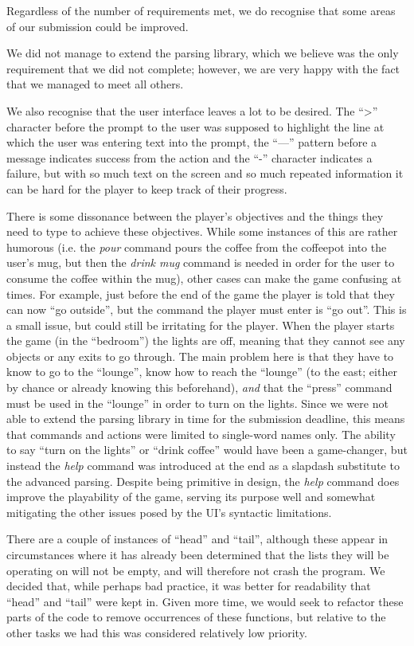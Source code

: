 \documentclass[a4paper,]{article}
\begin{document}
Regardless of the number of requirements met, we do recognise that some areas of our submission could be improved.

We did not manage to extend the parsing library, which we believe was the only requirement that we did not complete; however, we are very happy with the fact that we managed to meet all others.

We also recognise that the user interface leaves a lot to be desired.
The ``>'' character before the prompt to the user was supposed to highlight the line at which the user was entering text into the prompt, the ``---'' pattern before a message indicates success from the action and the ``-'' character indicates a failure, but with so much text on the screen and so much repeated information it can be hard for the player to keep track of their progress.

There is some dissonance between the player's objectives and the things they need to type to achieve these objectives.
While some instances of this are rather humorous (i.e. the \textit{pour} command pours the coffee from the coffeepot into the user's mug, but then the \textit{drink mug} command is needed in order for the user to consume the coffee within the mug), other cases can make the game confusing at times.
For example, just before the end of the game the player is told that they can now ``go outside'', but the command the player must enter is ``go out''.
This is a small issue, but could still be irritating for the player.
When the player starts the game (in the ``bedroom'') the lights are off, meaning that they cannot see any objects or any exits to go through.
The main problem here is that they have to know to go to the ``lounge'', know how to reach the ``lounge'' (to the east; either by chance or already knowing this beforehand), \textit{and} that the ``press'' command must be used in the ``lounge'' in order to turn on the lights.
Since we were not able to extend the parsing library in time for the submission deadline, this means that commands and actions were limited to single-word names only.
The ability to say ``turn on the lights'' or ``drink coffee'' would have been a game-changer, but instead the \textit{help} command was introduced at the end as a slapdash substitute to the advanced parsing.
Despite being primitive in design, the \textit{help} command does improve the playability of the game, serving its purpose well and somewhat mitigating the other issues posed by the UI's syntactic limitations.

There are a couple of instances of ``head'' and ``tail'', although these appear in circumstances where it has already been determined that the lists they will be operating on will not be empty, and will therefore not crash the program.
We decided that, while perhaps bad practice, it was better for readability that ``head'' and ``tail'' were kept in.
Given more time, we would seek to refactor these parts of the code to remove occurrences of these functions, but relative to the other tasks we had this was considered relatively low priority.
\end{document}
